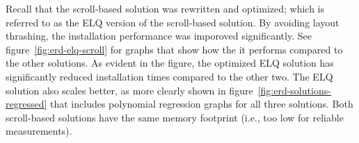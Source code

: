 \documentclass[a4paper,11pt]{kth-mag}
\begin{document}
        Recall that the scroll-based solution was rewritten and optimized; which is referred to as the \gls{ELQ} version of the scroll-based solution.
        By avoiding layout thrashing, the installation performance was imporoved significantly.
        See figure~\ref{fig:erd-elq-scroll} for graphs that show how the it performs compared to the other solutions.
        As evident in the figure, the optimized \gls{ELQ} solution has significantly reduced installation times compared to the other two.
        The \gls{ELQ} solution also scales better, as more clearly shown in figure~\ref{fig:erd-solutions-regressed} that includes polynomial regression graphs for all three solutions.
        Both scroll-based solutions have the same memory footprint (i.e., too low for reliable measurements).
        \begin{figure}[h!]
          \tiny
          \begin{center}
            \begin{minipage}[t]{.5\textwidth}
              \vspace{0pt}
              \centering
            \end{minipage}%
            \begin{minipage}[t]{.5\textwidth}
              \vspace{0pt}
              \centering
              \begin{tikzpicture}

\end{tikzpicture}
\end{minipage}
\end{center}
\end{figure}
\end{document}
